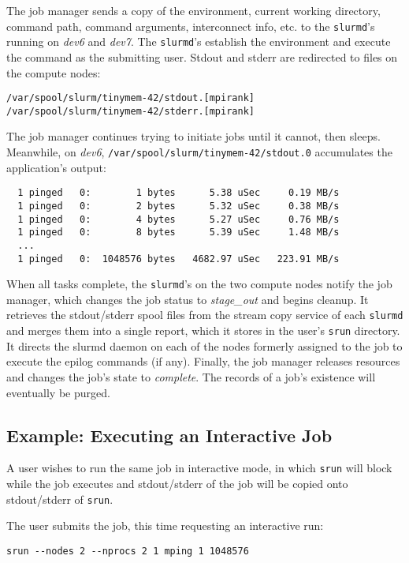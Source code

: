 The job manager sends a copy of the environment, current working directory,
command path, command arguments, interconnect info, etc.
to the {\tt slurmd}'s running on {\em dev6} and {\em dev7}.  
The {\tt slurmd}'s establish the environment and execute the command as 
the submitting user.  Stdout and stderr are redirected to files on the 
compute nodes:

\begin{verbatim}
/var/spool/slurm/tinymem-42/stdout.[mpirank]
/var/spool/slurm/tinymem-42/stderr.[mpirank]
\end{verbatim}

The job manager continues trying to initiate jobs until it cannot, then sleeps.
Meanwhile, on {\em dev6}, {\tt /var/spool/slurm/tinymem-42/stdout.0}
accumulates the application's output:

\begin{verbatim}
  1 pinged   0:        1 bytes      5.38 uSec     0.19 MB/s                     
  1 pinged   0:        2 bytes      5.32 uSec     0.38 MB/s                     
  1 pinged   0:        4 bytes      5.27 uSec     0.76 MB/s                     
  1 pinged   0:        8 bytes      5.39 uSec     1.48 MB/s                     
  ...
  1 pinged   0:  1048576 bytes   4682.97 uSec   223.91 MB/s              
\end{verbatim}

When all tasks complete, the {\tt slurmd}'s on the two compute nodes notify
the job manager, which changes the job status to {\em stage\_out} and begins cleanup.
It retrieves the stdout/stderr spool files from the stream copy service
of each {\tt slurmd} and merges them into a single report, 
which it stores in the user's {\tt srun} directory.
It directs the slurmd daemon on each of the nodes formerly assigned to the 
job to execute the epilog commands (if any).
Finally, the job manager releases resources and changes the job's state to 
{\em complete}. The records of a job's existence will eventually be purged.


\subsection{Example:  Executing an Interactive Job}

A user wishes to run the same job in interactive mode, in which {\tt srun}
will block while the job executes and stdout/stderr of the job will be 
copied onto stdout/stderr of {\tt srun}.

The user submits the job, this time requesting an interactive run:
\begin{verbatim}
srun --nodes 2 --nprocs 2 1 mping 1 1048576
\end{verbatim}

